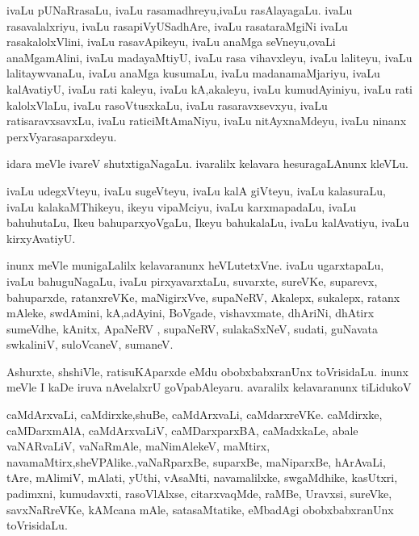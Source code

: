 \documentclass{article}
\begin{document}
\begin{mn}%
ivaLu pUNaRrasaLu, ivaLu rasamadhreyu,ivaLu rasAlayagaLu. ivaLu rasavalalxriyu, ivaLu 
rasapiVyUSadhAre, ivaLu rasataraMgiNi ivaLu rasakalolxVlini, ivaLu rasavApikeyu, ivaLu 
anaMga seVneyu,ovaLi anaMgamAlini, ivaLu madayaMtiyU, ivaLu rasa vihavxleyu, ivaLu 
laliteyu, ivaLu lalitaywvanaLu, ivaLu anaMga kusumaLu, ivaLu madanamaMjariyu, ivaLu 
kalAvatiyU, ivaLu rati kaleyu, ivaLu kA,akaleyu, ivaLu kumudAyiniyu, ivaLu rati 
kalolxVlaLu, ivaLu rasoVtusxkaLu, ivaLu rasaravxsevxyu, ivaLu ratisaravxsavxLu, ivaLu 
raticiMtAmaNiyu, ivaLu nitAyxnaMdeyu, ivaLu ninanx perxVyarasaparxdeyu.
\end{mn}

\begin{mn}%
idara meVle ivareV shutxtigaNagaLu. ivaralilx kelavara hesuragaLAnunx kleVLu.
\end{mn}

\begin{mn}%
ivaLu udegxVteyu, ivaLu sugeVteyu, ivaLu kalA giVteyu, ivaLu kalasuraLu, ivaLu 
kalakaMThikeyu, ikeyu vipaMciyu, ivaLu karxmapadaLu, ivaLu bahuhutaLu, Ikeu 
bahuparxyoVgaLu, Ikeyu bahukalaLu, ivaLu kalAvatiyu, ivaLu kirxyAvatiyU. 
\end{mn}

\begin{mn}%
inunx meVle munigaLalilx kelavaranunx heVLutetxVne. ivaLu ugarxtapaLu, ivaLu bahuguNagaLu, 
ivaLu pirxyavarxtaLu, suvarxte, sureVKe, suparevx, bahuparxde, ratanxreVKe, maNigirxVve, 
supaNeRV, Akalepx, sukalepx, ratanx mAleke, swdAmini, kA,adAyini, BoVgade, vishavxmate, 
dhAriNi, dhAtirx sumeVdhe, kAnitx, ApaNeRV , supaNeRV, sulakaSxNeV, sudati, guNavata 
swkaliniV, suloVcaneV, sumaneV.
\end{mn}

\begin{mn}%
Ashurxte, shshiVle, ratisuKAparxde eMdu obobxbabxranUnx toVrisidaLu. inunx meVle I kaDe 
iruva nAvelalxrU goVpabAleyaru. avaralilx kelavaranunx tiLidukoV
\end{mn}

\begin{mn}%
caMdArxvaLi, caMdirxke,shuBe, caMdArxvaLi, caMdarxreVKe. caMdirxke, caMDarxmAlA, 
caMdArxvaLiV, caMDarxparxBA, caMadxkaLe, abale vaNARvaLiV, vaNaRmAle, maNimAlekeV, 
maMtirx, navamaMtirx,sheVPAlike.,vaNaRparxBe, suparxBe, maNiparxBe, hArAvaLi, tAre, 
mAlimiV, mAlati, yUthi, vAsaMti, navamalilxke, swgaMdhike, kasUtxri, padimxni, kumudavxti, 
rasoVlAlxse, citarxvaqMde, raMBe, Uravxsi, sureVke, savxNaRreVKe, kAMcana mAle, 
satasaMtatike, eMbadAgi obobxbabxranUnx toVrisidaLu. 
\end{mn}
\end{document}
